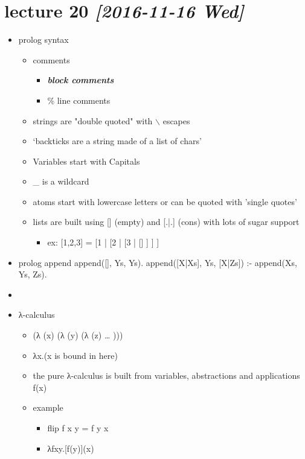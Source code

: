 \documentclass[11pt]{article}
\begin{document}
\section{lecture 20 \textit{[2016-11-16 Wed]}}
\label{sec-18}
\begin{itemize}
\item prolog syntax
\begin{itemize}
\item comments
\begin{itemize}
\item \emph{\textbf{block comments}}
\item \% line comments
\end{itemize}
\item strings are "double quoted" with $\backslash$ escapes
\item `backticks are a string made of a list of chars'
\item Variables start with Capitals
\item \_ is a wildcard
\item atoms start with lowercase letters or can be quoted with 'single quotes'
\item lists are built using [] (empty) and [.|.] (cons) with lots of sugar support
\begin{itemize}
\item ex: [1,2,3] = [1 | [2 | [3 | [] ] ] ]
\end{itemize}
\end{itemize}
\item prolog append
append([], Ys, Ys).
append([X|Xs], Ys, [X|Zs]) :- append(Xs, Ys, Zs).
\item 
\item λ-calculus
\begin{itemize}
\item (λ (x) (λ (y) (λ (z) \ldots{} )))
\item λx.(x is bound in here)
\item the pure λ-calculus is built from variables, abstractions and applications f(x)
\item example
\begin{itemize}
\item flip f x y = f y x
\item λfxy.[f(y)](x)
\end{itemize}
\end{itemize}
\end{itemize}
\end{document}
